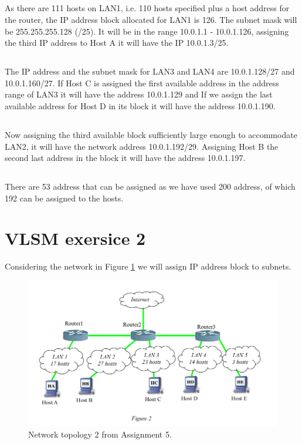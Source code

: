 \documentclass{article}
\begin{document}
\subsection{} As there are 111 hosts on LAN1, i.e. 110 hosts specified plus a host address for the router, the IP address block allocated for LAN1 is 126. The subnet mask will be 255.255.255.128 (/25). It will be in the range 10.0.1.1 - 10.0.1.126, assigning the third IP address to Host A it will have the IP 10.0.1.3/25. 

\subsection{} The IP address and the subnet mask for LAN3 and LAN4 are 10.0.1.128/27 and 10.0.1.160/27.
If Host C is assigned the first available address in the address range of LAN3 it will have the address 10.0.1.129 and If we assign the last available address for Host D in its block it will have the address 10.0.1.190.

\subsection{} Now assigning the third available block sufficiently large enough to accommodate LAN2, it will have the network address 10.0.1.192/29. Assigning Host B the second last address in the block it will have the address 10.0.1.197. 

\subsection{} 
There are 53 address that can be assigned as we have used 200 address, of which 192 can be assigned to the hosts. 


\section{VLSM exersice 2}

Considering the network in Figure \ref{fig:network-two} we will assign IP address block to subnets.

\begin{figure}[!h]
    \centering
    \includegraphics[scale=0.3]{5-network-two}
    \caption{Network topology 2 from Assignment 5.}
    \label{fig:network-two}
\end{figure}
\end{document}
